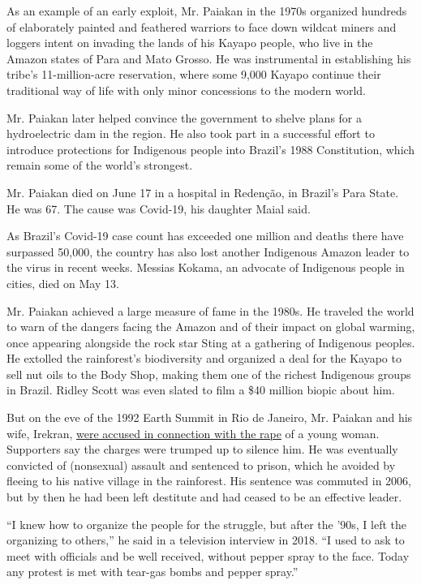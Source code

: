 As an example of an early exploit, Mr. Paiakan in the 1970s organized
hundreds of elaborately painted and feathered warriors to face down
wildcat miners and loggers intent on invading the lands of his Kayapo
people, who live in the Amazon states of Para and Mato Grosso. He was
instrumental in establishing his tribe's 11-million-acre reservation,
where some 9,000 Kayapo continue their traditional way of life with only
minor concessions to the modern world.

Mr. Paiakan later helped convince the government to shelve plans for a
hydroelectric dam in the region. He also took part in a successful
effort to introduce protections for Indigenous people into Brazil's 1988
Constitution, which remain some of the world's strongest.

Mr. Paiakan died on June 17 in a hospital in Redenção, in Brazil's Para
State. He was 67. The cause was Covid-19, his daughter Maial said.

As Brazil's Covid-19 case count has exceeded one million and deaths
there have surpassed 50,000, the country has also lost another
Indigenous Amazon leader to the virus in recent weeks. Messias Kokama,
an advocate of Indigenous people in cities, died on May 13.

Mr. Paiakan achieved a large measure of fame in the 1980s. He traveled
the world to warn of the dangers facing the Amazon and of their impact
on global warming, once appearing alongside the rock star Sting at a
gathering of Indigenous peoples. He extolled the rainforest's
biodiversity and organized a deal for the Kayapo to sell nut oils to the
Body Shop, making them one of the richest Indigenous groups in Brazil.
Ridley Scott was even slated to film a \$40 million biopic about him.

But on the eve of the 1992 Earth Summit in Rio de Janeiro, Mr. Paiakan
and his wife, Irekran,
\href{https://www.nytimes3xbfgragh.onion/1992/07/05/world/indian-white-rape-case-splits-brazil.html}{were
accused in connection with the rape} of a young woman. Supporters say
the charges were trumped up to silence him. He was eventually convicted
of (nonsexual) assault and sentenced to prison, which he avoided by
fleeing to his native village in the rainforest. His sentence was
commuted in 2006, but by then he had been left destitute and had ceased
to be an effective leader.

``I knew how to organize the people for the struggle, but after the
'90s, I left the organizing to others,'' he said in a television
interview in 2018. ``I used to ask to meet with officials and be well
received, without pepper spray to the face. Today any protest is met
with tear-gas bombs and pepper spray.''

